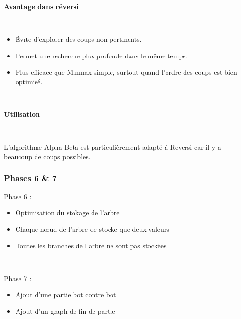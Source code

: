 \documentclass[9pt]{beamer}
\begin{document}
\begin{frame}
  \textbf{Avantage dans réversi}
  
  ~

  \begin{itemize}
    \item Évite d’explorer des coups non pertinents.
    \item Permet une recherche plus profonde dans le même temps.
    \item Plus efficace que Minmax simple, surtout quand l’ordre des coups est bien optimisé.
  \end{itemize}

  ~


  \textbf{Utilisation}

  ~

  L’algorithme Alpha-Beta est particulièrement adapté à Reversi car il y a beaucoup de coups possibles.
\end{frame}

\begin{frame}
  \frametitle{Phases 6 \& 7}
  Phase 6 :
  \begin{itemize}
    \item Optimisation du stokage de l'arbre
    \item Chaque nœud de l'arbre de stocke que deux valeurs
    \item Toutes les branches de l'arbre ne sont pas stockées
  \end{itemize}

  ~

  Phase 7 :
  \begin{itemize}
    \item Ajout d'une partie bot contre bot
    \item Ajout d'un graph de fin de partie 
  \end{itemize}
\end{frame}
\end{document}
